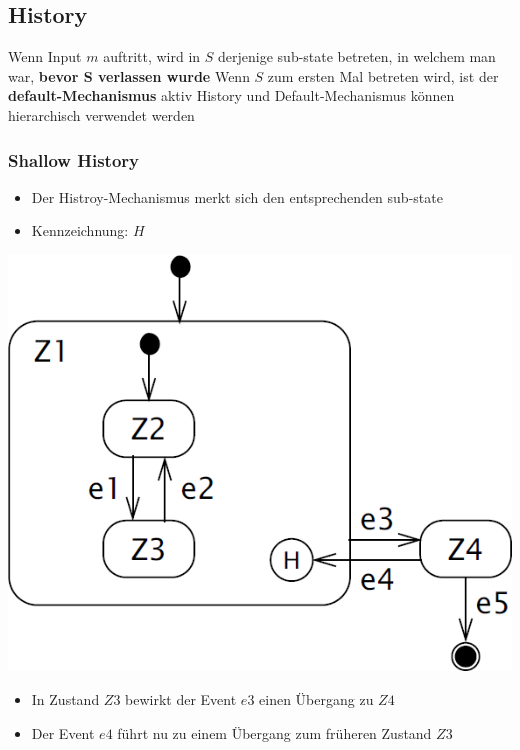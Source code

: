 \subsection{History}

\begin{outline}
    \1 Wenn Input $m$ auftritt, wird in $S$ derjenige sub-state betreten, in welchem man war, \textbf{bevor $\bm{S}$ verlassen wurde}
        \2 Wenn $S$ zum ersten Mal betreten wird, ist der \textbf{default-Mechanismus} aktiv
    \1 History und Default-Mechanismus können hierarchisch verwendet werden
\end{outline}


\subsubsection{Shallow History}

\begin{itemize}
    \item Der Histroy-Mechanismus merkt sich den entsprechenden sub-state
    \item Kennzeichnung: $H$
\end{itemize}



\begin{minipage}[c]{0.48\columnwidth}
    \includegraphics[width=\columnwidth]{images/statechart_shallow_history.png}
\end{minipage}
\hfill
\begin{minipage}[c]{0.48\columnwidth}
    \begin{itemize}
        \item In Zustand $Z3$ bewirkt der Event $e3$ einen Übergang zu $Z4$
        \item Der Event $e4$ führt nu zu einem Übergang zum früheren Zustand $Z3$
    \end{itemize}
\end{minipage}


